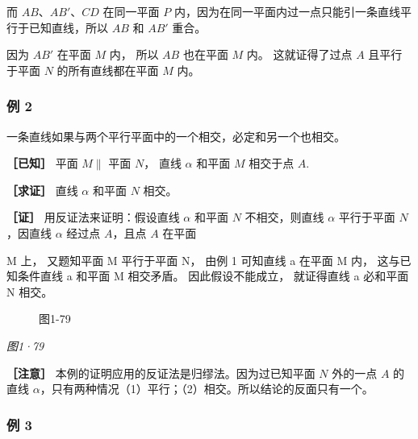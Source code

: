 而 \(AB\)、\(AB'\)、\(CD\) 在同一平面 \(P\)
内，因为在同一平面内过一点只能引一条直线平行于已知直线，所以 \(AB\) 和
\(AB'\) 重合。

因为 \(AB'\) 在平面 \(M\) 内， 所以 \(AB\) 也在平面 \(M\) 内。
这就证得了过点 \(A\) 且平行于平面 \(N\) 的所有直线都在平面 \(M\) 内。

\subsubsection{例 2}

一条直线如果与两个平行平面中的一个相交，必定和另一个也相交。

\textbf{［已知］} 平面 \(M \parallel\) 平面 \(N\)， 直线 \(\alpha\)
和平面 \(M\) 相交于点 \(A\).

\textbf{［求证］} 直线 \(\alpha\) 和平面 \(N\) 相交。

\textbf{［证］} 用反证法来证明：假设直线 \(\alpha\) 和平面 \(N\)
不相交，则直线 \(\alpha\) 平行于平面 \(N\)，因直线 \(\alpha\) 经过点
\(A\)，且点 \(A\) 在平面

M 上， 又题知平面 M 平行于平面 N， 由例 1 可知直线 a 在平面 M 内，
这与已知条件直线 a 和平面 M 相交矛盾。 因此假设不能成立， 就证得直线 a
必和平面 N 相交。

\begin{figure}
\centering
{}
\caption{图1-79}
\end{figure}

\emph{图1·79}

\textbf{［注意］} 本例的证明应用的反证法是归缪法。因为过已知平面 \(N\)
外的一点 \(A\) 的直线
\(\alpha\)，只有两种情况（1）平行；（2）相交。所以结论的反面只有一个。

\subsubsection{例 3}

